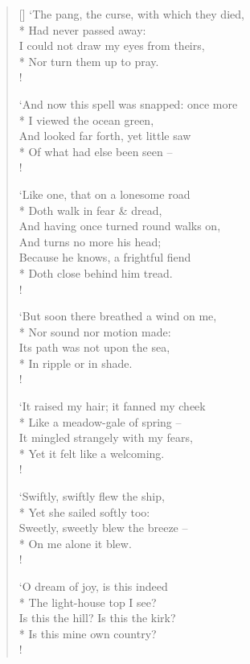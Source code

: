 \documentclass[MAIN]{subfiles}
\begin{document}
\begin{verse}[\versewidth]
`The pang, the curse, with which they died,\\*
\vin Had never passed away:\\
I could not draw my eyes from theirs,\\*
\vin Nor turn them up to pray.\\!

`And now this spell was snapped: once more\\*
\vin I viewed the ocean green,\\
And looked far forth, yet little saw\\*
\vin Of what had else been seen --\\!

`Like one, that on a lonesome road\\*
\vin Doth walk in fear \& dread,\\
And having once turned round walks on,\\
\vin And turns no more his head;\\
Because he knows, a frightful fiend\\*
\vin Doth close behind him tread.\\!

`But soon there breathed a wind on me,\\*
\vin Nor sound nor motion made:\\
Its path was not upon the sea,\\*
\vin In ripple or in shade.\\!

`It raised my hair; it fanned my cheek\\*
\vin Like a meadow-gale of spring --\\
It mingled strangely with my fears,\\*
\vin Yet it felt like a welcoming.\\!

`Swiftly, swiftly flew the ship,\\*
\vin Yet she sailed softly too:\\
Sweetly, sweetly blew the breeze --\\*
\vin On me alone it blew.\\!

`O dream of joy, is this indeed\\* 
\vin The light-house top I see?\\
Is this the hill? Is this the kirk?\\* 
\vin Is this mine own country?\\!


\end{verse}
\end{document}
